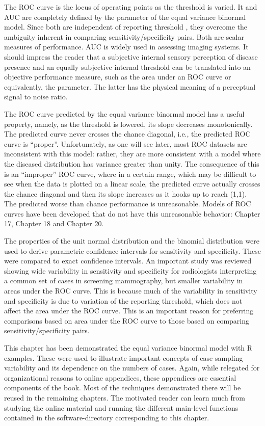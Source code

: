 \documentclass[
]{book}
\begin{document}
The ROC curve is the locus of operating points as the threshold is varied. It and AUC are completely defined by the parameter of the equal variance binormal model. Since both are independent of reporting threshold , they overcome the ambiguity inherent in comparing sensitivity/specificity pairs. Both are scalar measures of performance. AUC is widely used in assessing imaging systems. It should impress the reader that a subjective internal sensory perception of disease presence and an equally subjective internal threshold can be translated into an objective performance measure, such as the area under an ROC curve or equivalently, the parameter. The latter has the physical meaning of a perceptual signal to noise ratio.

The ROC curve predicted by the equal variance binormal model has a useful property, namely, as the threshold is lowered, its slope decreases monotonically. The predicted curve never crosses the chance diagonal, i.e., the predicted ROC curve is ``proper''. Unfortunately, as one will see later, most ROC datasets are inconsistent with this model: rather, they are more consistent with a model where the diseased distribution has variance greater than unity. The consequence of this is an ``improper'' ROC curve, where in a certain range, which may be difficult to see when the data is plotted on a linear scale, the predicted curve actually crosses the chance diagonal and then its slope increases as it hooks up to reach (1,1). The predicted worse than chance performance is unreasonable. Models of ROC curves have been developed that do not have this unreasonable behavior: Chapter 17, Chapter 18 and Chapter 20.

The properties of the unit normal distribution and the binomial distribution were used to derive parametric confidence intervals for sensitivity and specificity. These were compared to exact confidence intervals. An important study was reviewed showing wide variability in sensitivity and specificity for radiologists interpreting a common set of cases in screening mammography, but smaller variability in areas under the ROC curve. This is because much of the variability in sensitivity and specificity is due to variation of the reporting threshold, which does not affect the area under the ROC curve. This is an important reason for preferring comparisons based on area under the ROC curve to those based on comparing sensitivity/specificity pairs.

This chapter has been demonstrated the equal variance binormal model with R examples. These were used to illustrate important concepts of case-sampling variability and its dependence on the numbers of cases. Again, while relegated for organizational reasons to online appendices, these appendices are essential components of the book. Most of the techniques demonstrated there will be reused in the remaining chapters. The motivated reader can learn much from studying the online material and running the different main-level functions contained in the software-directory corresponding to this chapter.
\end{document}
